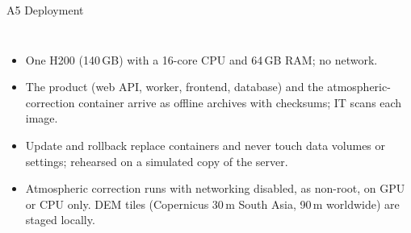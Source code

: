 \documentclass[aspectratio=169,10pt]{beamer}
\begin{document}
\begin{frame}{A5 Deployment}
\begin{columns}[T,onlytextwidth]
\par
\begin{itemize}\setlength{\itemsep}{0.4mm}\fontsize{6.6}{7.9}\selectfont
\item One H200 (140\,GB) with a 16-core CPU and 64\,GB RAM; no network.
\item The product (web API, worker, frontend, database) and the atmospheric-correction container arrive as offline archives with checksums; IT scans each image.
\item Update and rollback replace containers and never touch data volumes or settings; rehearsed on a simulated copy of the server.
\item Atmospheric correction runs with networking disabled, as non-root, on GPU or CPU only. DEM tiles (Copernicus 30\,m South Asia, 90\,m worldwide) are staged locally.
\end{itemize}
\vspace{1mm}
\par\vspace{0.3mm}
\par
\par\vspace{0.3mm}
\end{columns}
\end{frame}
\end{document}
